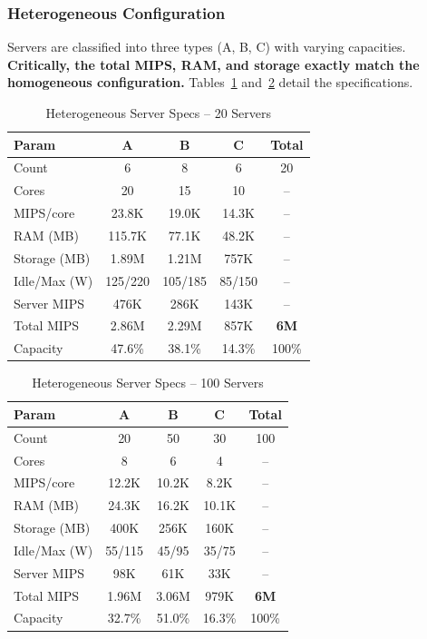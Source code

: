 \documentclass[conference]{IEEEtran}
\begin{document}
\subsubsection{Heterogeneous Configuration}

Servers are classified into three types (A, B, C) with varying capacities. \textbf{Critically, the total MIPS, RAM, and storage exactly match the homogeneous configuration.} Tables~\ref{tab:hetero_specs_20} and~\ref{tab:hetero_specs_100} detail the specifications.

\begin{table}[H]
\centering
\caption{Heterogeneous Server Specs -- 20 Servers}
\label{tab:hetero_specs_20}
\footnotesize
\begin{tabular}{@{}lcccc@{}}
\toprule
\textbf{Param} & \textbf{A} & \textbf{B} & \textbf{C} & \textbf{Total} \\
\midrule
Count & 6 & 8 & 6 & 20 \\
Cores & 20 & 15 & 10 & -- \\
MIPS/core & 23.8K & 19.0K & 14.3K & -- \\
RAM (MB) & 115.7K & 77.1K & 48.2K & -- \\
Storage (MB) & 1.89M & 1.21M & 757K & -- \\
Idle/Max (W) & 125/220 & 105/185 & 85/150 & -- \\
\midrule
Server MIPS & 476K & 286K & 143K & -- \\
Total MIPS & 2.86M & 2.29M & 857K & \textbf{6M} \\
Capacity & 47.6\% & 38.1\% & 14.3\% & 100\% \\
\bottomrule
\end{tabular}
\end{table}

\begin{table}[H]
\centering
\caption{Heterogeneous Server Specs -- 100 Servers}
\label{tab:hetero_specs_100}
\footnotesize
\begin{tabular}{@{}lcccc@{}}
\toprule
\textbf{Param} & \textbf{A} & \textbf{B} & \textbf{C} & \textbf{Total} \\
\midrule
Count & 20 & 50 & 30 & 100 \\
Cores & 8 & 6 & 4 & -- \\
MIPS/core & 12.2K & 10.2K & 8.2K & -- \\
RAM (MB) & 24.3K & 16.2K & 10.1K & -- \\
Storage (MB) & 400K & 256K & 160K & -- \\
Idle/Max (W) & 55/115 & 45/95 & 35/75 & -- \\
\midrule
Server MIPS & 98K & 61K & 33K & -- \\
Total MIPS & 1.96M & 3.06M & 979K & \textbf{6M} \\
Capacity & 32.7\% & 51.0\% & 16.3\% & 100\% \\
\bottomrule
\end{tabular}
\end{table}
\end{document}
